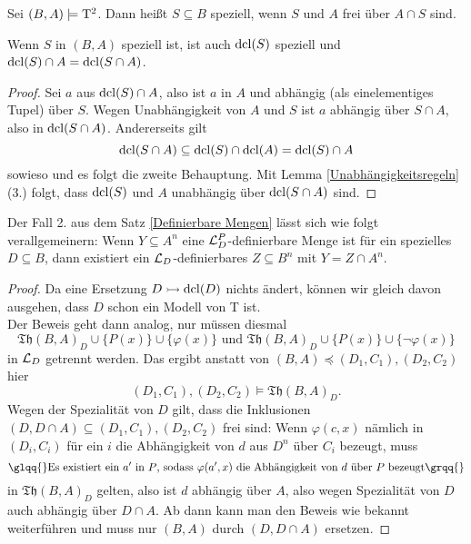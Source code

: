 \begin{definition}
	Sei $(B,A)\models\operatorname{T^2}$. Dann heißt $S\subseteq B$ speziell, wenn $S$ und $A$ frei über $A\cap S$ sind.
\end{definition}

\begin{lemma}\label{Spezialität dcl}
	Wenn $S$ in $(B,A)$ speziell ist, ist auch $\operatorname{dcl}(S)$ speziell und $\operatorname{dcl}(S)\cap A=\operatorname{dcl}(S\cap A)$.
\end{lemma}
\begin{proof}
	Sei $a$ aus $\operatorname{dcl}(S)\cap A$, also ist $a$ in $A$ und abhängig (als einelementiges Tupel) über $S$. Wegen Unabhängigkeit von $A$ und $S$ ist $a$ abhängig über $S\cap A$, also in $\operatorname{dcl}(S\cap A)$. Andererseits gilt $$\operatorname{dcl}(S\cap A)\subseteq\operatorname{dcl}(S)\cap\operatorname{dcl}(A)=\operatorname{dcl}(S)\cap A$$ sowieso und es folgt die zweite Behauptung. Mit Lemma \ref{Unabhängigkeitsregeln} (3.) folgt, dass $\operatorname{dcl}(S)$ und $A$ unabhängig über $\operatorname{dcl}(S\cap A)$ sind.
\end{proof}

\begin{lemma}\label{Definierbare Mengen Spezialität}
	Der Fall 2. aus dem Satz \ref{Definierbare Mengen} lässt sich wie folgt verallgemeinern: Wenn $Y\subseteq A^n$ eine $\mathcal{L}^P_D$-definierbare Menge ist für ein spezielles $D\subseteq B$, dann existiert ein $\mathcal{L}_D$-definierbares $Z\subseteq B^n$ mit $Y=Z\cap A^n$.
\end{lemma}
\begin{proof}
	Da eine Ersetzung $D\rightarrowtail\operatorname{dcl}(D)$ nichts ändert, können wir gleich davon ausgehen, dass $D$ schon ein Modell von T ist.\\
	Der Beweis geht dann analog, nur müssen diesmal $$\mathfrak{Th}(B,A)_D\cup\{P(x)\}\cup\{\varphi(x)\}\text{ und }\mathfrak{Th}(B,A)_D\cup\{P(x)\}\cup\{\neg\varphi(x)\}$$ in $\mathcal{L}_D$ getrennt werden. Das ergibt anstatt von $(B,A)\preceq(D_1,C_1),(D_2,C_2)$ hier $$(D_1,C_1),(D_2,C_2)\models\mathfrak{Th}(B,A)_D.$$
	Wegen der Spezialität von $D$ gilt, dass die Inklusionen $(D,D\cap A)\subseteq(D_1,C_1),(D_2,C_2)$ frei sind: Wenn $\varphi(c,x)$ nämlich in $(D_i,C_i)$ für ein $i$ die Abhängigkeit von $d$ aus $D^n$ über $C_i$ bezeugt, muss $$\glqq{}\text{Es existiert ein }a'\text{ in }P\text{, sodass }\varphi(a',x)\text{ die Abhängigkeit von }d\text{ über }P\text{ bezeugt}\grqq{}$$ in $\mathfrak{Th}(B,A)_D$ gelten, also ist $d$ abhängig über $A$, also wegen Spezialität von $D$ auch abhängig über $D\cap A$. Ab dann kann man den Beweis wie bekannt weiterführen und muss nur $(B,A)$ durch $(D,D\cap A)$ ersetzen.
\end{proof}

